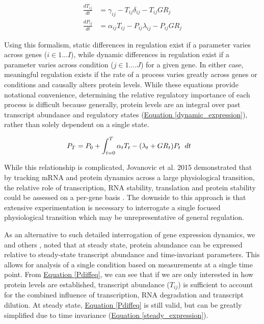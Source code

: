\begin{subequations}
\begin{align}
\frac{dT_{ij}}{dt} &= \gamma_{ij} - T_{ij}\delta_{ij} - T_{ij}GR_{j}\label{Tdiffeq}\\
\frac{dP_{ij}}{dt} &= \alpha_{ij}T_{ij} - P_{ij}\lambda_{ij} - P_{ij}GR_{j}\label{Pdiffeq}
\end{align}
\end{subequations}

Using this formalism, static differences in regulation exist if a parameter varies across genes ($i \in 1 ... I$), while dynamic differences in regulation exist if a parameter varies across condition ($j \in 1....J$) for a given gene.  In either case, meaningful regulation exists if the rate of a process varies greatly across genes or conditions and causally alters protein levels. While these equations provide notational convenience, determining the relative regulatory importance of each process is difficult because generally, protein levels are an integral over past transcript abundance and regulatory states (\hyperref[dynamic_expression]{Equation \ref{dynamic_expression}}), rather than solely dependent on a single state.

\begin{align}
P_{T} &= P_{0} + \int_{t = 0}^{T} \alpha_{t} T_{t} - (\lambda_{t} + GR_{t}) P_{t} \hspace{2mm} dt \label{dynamic_expression}
\end{align}

While this relationship is complicated, Jovanovic et al. 2015 demonstrated that by tracking mRNA and protein dynamics across a large physiological transition, the relative role of transcription, RNA stability, translation and protein stability could be assessed on a per-gene basis \cite{Jovanovic:2015hp}. The downside to this approach is that extensive experimentation is necessary to interrogate a single focused physiological transition which may be unrepresentative of general regulation.

As an alternative to such detailed interrogation of gene expression dynamics, we and others \cite{Belle:2006hv, Csardi:2015kx}, noted that at steady state, protein abundance can be expressed relative to steady-state transcript abundance and time-invariant parameters. This allows for analysis of a single condition based on measurements at a single time point.  From \hyperref[Pdiffeq]{Equation \ref{Pdiffeq}}, we can see that if we are only interested in how protein levels are established, transcript abundance ($T_{ij}$) is sufficient to account for the combined influence of transcription, RNA degradation and transcript dilution. At steady state, \hyperref[Pdiffeq]{Equation \ref{Pdiffeq}} is still valid, but can be greatly simplified due to time invariance (\hyperref[steady_expression]{Equation \ref{steady_expression}}).

